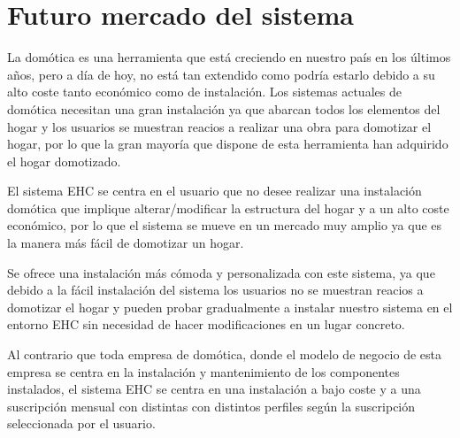 \section{Futuro mercado del sistema}
    La domótica es una herramienta que está creciendo en nuestro país en los últimos años, pero a día de hoy, no está tan extendido como podría estarlo debido a su alto coste tanto económico como de instalación. Los sistemas actuales de domótica necesitan una gran instalación ya que abarcan todos los elementos del hogar y los usuarios se muestran reacios a realizar una obra para domotizar el hogar, por lo que la gran mayoría que dispone de esta herramienta han adquirido el hogar domotizado.
    \par
    El sistema EHC se centra en el usuario que no desee realizar una instalación domótica que implique alterar/modificar la estructura del hogar y a un alto coste económico, por lo que el sistema se mueve en un mercado muy amplio ya que es la manera más fácil de domotizar un hogar.
    \par
    Se ofrece una instalación más cómoda y personalizada con este sistema, ya que   debido a la fácil instalación del sistema los usuarios no se muestran reacios a domotizar el hogar y pueden probar gradualmente a instalar nuestro sistema en el entorno EHC sin necesidad de hacer modificaciones en un lugar concreto.
    \par
    Al contrario que toda empresa de domótica, donde el modelo de negocio de esta empresa se centra en la instalación y mantenimiento de los componentes instalados, el sistema EHC se centra en una instalación a bajo coste y a una suscripción mensual con distintas con distintos perfiles según la suscripción seleccionada por el usuario.
